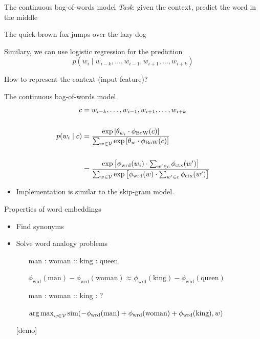 \documentclass[usenames,dvipsnames,notes]{beamer}
\begin{document}
\begin{frame}
    {The continuous bag-of-words model}
    \emph{Task}: given the context, predict the word in the middle 
    \begin{center}
        The quick brown fox jumps over the lazy dog
    \end{center}

    Similary, we can use logistic regression for the prediction
    $$
    p(w_i \mid w_{i-k}, \ldots, w_{i-1}, w_{i+1}, \ldots, w_{i+k})
    $$

    How to represent the context (input feature)?
\end{frame}

\begin{frame}
    {The continuous bag-of-words model}
    \begin{align*}
        c &= w_{i-k}, \ldots, w_{i-1}, w_{i+1}, \ldots, w_{i+k} \\\\
        p(w_i\mid c) &= \frac{\exp\left[ \theta_{w_i}\cdot \phi_{\text{BoW}}(c) \right]}
        {\sum_{w\in\mathcal{V}} \exp\left[ \theta_{w}\cdot\phi_{\text{BoW}}(c) \right]} \\\\
        &= \frac{\exp\left[ \phi_{\text{wrd}}(w_i)\cdot \sum_{w'\in c}\phi_{\text{ctx}}(w') \right]}
        {\sum_{w\in\mathcal{V}} \exp\left[ \phi_{\text{wrd}}(w)\cdot\sum_{w'\in c}\phi_{\text{ctx}}(w') \right]} \\
    \end{align*}

    \begin{itemize}
        \item Implementation is similar to the skip-gram model.
    \end{itemize}
\end{frame}

\begin{frame}
    {Properties of word embeddings}
    \begin{itemize}
        \itemsep1em
        \item Find synonyms
        \item Solve word analogy problems
            \begin{itemize}
                \item[] man : woman :: king : queen
                \item[] $\phi_{\text{wrd}}(\text{man}) - \phi_{\text{wrd}}(\text{woman}) \approx \phi_{\text{wrd}}(\text{king}) - \phi_{\text{wrd}}(\text{queen})$
                \item[]
                \item[] man : woman :: king : ? 
                \item[] $\operatorname*{arg\,max}_{w\in\mathcal{V}} \text{sim}(-\phi_{\text{wrd}}(\text{man}) + \phi_{\text{wrd}}(\text{woman}) + \phi_{\text{wrd}}(\text{king}), w)$
            \end{itemize}
        \item[] [demo]
    \end{itemize}
\end{frame}
\end{document}

